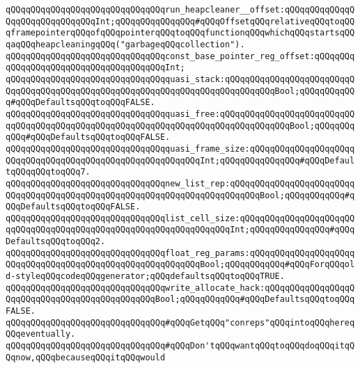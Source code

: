 \newline
\verb|qQQqqQQqqQQqqQQqqQQqqQQqqQQqqQQqrun_heapcleaner__offset:qQQqqQQqqQQqqQQqqQQqqQQqqQQqqQQqInt;qQQqqQQqqQQqqQQq#qQQqOffsetqQQqrelativeqQQqtoqQQqframepointerqQQqofqQQqpointerqQQqtoqQQqfunctionqQQqwhichqQQqstartsqQQqaqQQqheapcleaningqQQq("garbageqQQqcollection").|\newline
\verb|qQQqqQQqqQQqqQQqqQQqqQQqqQQqqQQqconst_base_pointer_reg_offset:qQQqqQQqqQQqqQQqqQQqqQQqqQQqqQQqqQQqqQQqInt;|\newline
\newline
\verb|qQQqqQQqqQQqqQQqqQQqqQQqqQQqqQQqquasi_stack:qQQqqQQqqQQqqQQqqQQqqQQqqQQqqQQqqQQqqQQqqQQqqQQqqQQqqQQqqQQqqQQqqQQqqQQqqQQqqQQqBool;qQQqqQQqqQQq#qQQqDefaultsqQQqtoqQQqFALSE.|\newline
\verb|qQQqqQQqqQQqqQQqqQQqqQQqqQQqqQQqquasi_free:qQQqqQQqqQQqqQQqqQQqqQQqqQQqqQQqqQQqqQQqqQQqqQQqqQQqqQQqqQQqqQQqqQQqqQQqqQQqqQQqqQQqBool;qQQqqQQqqQQq#qQQqDefaultsqQQqtoqQQqFALSE.|\newline
\verb|qQQqqQQqqQQqqQQqqQQqqQQqqQQqqQQqquasi_frame_size:qQQqqQQqqQQqqQQqqQQqqQQqqQQqqQQqqQQqqQQqqQQqqQQqqQQqqQQqqQQqInt;qQQqqQQqqQQqqQQq#qQQqDefaultqQQqqQQqtoqQQq7.|\newline
\newline
\verb|qQQqqQQqqQQqqQQqqQQqqQQqqQQqqQQqnew_list_rep:qQQqqQQqqQQqqQQqqQQqqQQqqQQqqQQqqQQqqQQqqQQqqQQqqQQqqQQqqQQqqQQqqQQqqQQqqQQqBool;qQQqqQQqqQQq#qQQqDefaultsqQQqtoqQQqFALSE.|\newline
\verb|qQQqqQQqqQQqqQQqqQQqqQQqqQQqqQQqlist_cell_size:qQQqqQQqqQQqqQQqqQQqqQQqqQQqqQQqqQQqqQQqqQQqqQQqqQQqqQQqqQQqqQQqqQQqInt;qQQqqQQqqQQqqQQq#qQQqDefaultsqQQqtoqQQq2.|\newline
\newline
\verb|qQQqqQQqqQQqqQQqqQQqqQQqqQQqqQQqfloat_reg_params:qQQqqQQqqQQqqQQqqQQqqQQqqQQqqQQqqQQqqQQqqQQqqQQqqQQqqQQqqQQqBool;qQQqqQQqqQQq#qQQqForqQQqold-styleqQQqcodeqQQqgenerator;qQQqdefaultsqQQqtoqQQqTRUE.|\newline
\newline
\verb|qQQqqQQqqQQqqQQqqQQqqQQqqQQqqQQqwrite_allocate_hack:qQQqqQQqqQQqqQQqqQQqqQQqqQQqqQQqqQQqqQQqqQQqqQQqBool;qQQqqQQqqQQq#qQQqDefaultsqQQqtoqQQqFALSE.|\newline
\newline
\verb|qQQqqQQqqQQqqQQqqQQqqQQqqQQqqQQq#qQQqGetqQQq"conreps"qQQqintoqQQqhereqQQqeventually.|\newline
\verb|qQQqqQQqqQQqqQQqqQQqqQQqqQQqqQQq#qQQqDon'tqQQqwantqQQqtoqQQqdoqQQqitqQQqnow,qQQqbecauseqQQqitqQQqwould|\newline
